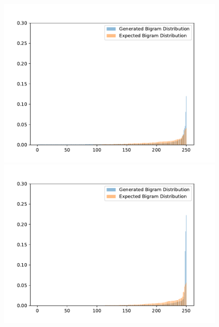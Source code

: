 \begin{figure}[H]
	\centering
	\small
	\endminipage\hfill
	\includegraphics[width=\linewidth]{img/plots/opensubtitles_not_reversed/bigram_distribution_comparison_step_1500000.pdf}
	\centering
	\small
	\endminipage\hfill
	\includegraphics[width=\linewidth]{img/plots/opensubtitles_not_reversed/bigram_distribution_comparison_step_2000000.pdf}
	\centering
	\small
	\endminipage\hfill

\end{figure}
